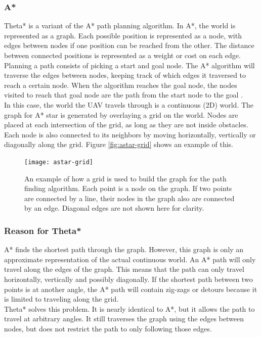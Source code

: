 \subsubsection{A*}
Theta* is a variant of the A* path planning algorithm. In A*, the world is represented as a graph. Each possible position is represented as a node, with edges between nodes if one position can be reached from the other. The distance between connected positions is represented as a weight or cost on each edge. \\
Planning a path consists of picking a start and goal node. The A* algorithm will traverse the edges between nodes, keeping track of which edges it traversed to reach a certain node. When the algorithm reaches the goal node, the nodes visited to reach that goal node are the path from the start node to the goal . \\
In this case, the world the UAV travels through is a continuous (2D) world. The graph for A* star is generated by overlaying a grid on the world. Nodes are placed at each intersection of the grid, as long as they are not inside obstacles. Each node is also connected to its neighbors by moving horizontally, vertically or diagonally along the grid. Figure \ref{fig:astar-grid} shows an example of this.
\begin{figure}
\centering
\texttt{[image: astar-grid]}
\caption{An example of how a grid is used to build the graph for the path finding algorithm. Each point is a node on the graph. If two points are connected by a line, their nodes in the graph also are connected by an edge. Diagonal edges are not shown here for clarity.}
\label{figure:astar-grid}
\end{figure}

\subsubsection{Reason for Theta*}
A* finds the shortest path through the graph. However, this graph is only an approximate representation of the actual continuous world. An A* path will only travel along the edges of the graph. This means that the path can only travel horizontally, vertically and possibly diagonally. If the shortest path between two points is at another angle, the A* path will contain zig-zags or detours because it is limited to traveling along the grid. \\
Theta* solves this problem. It is nearly identical to A*, but it allows the path to travel at arbitrary angles. It still traverses the graph using the edges between nodes, but does not restrict the path to only following those edges.

